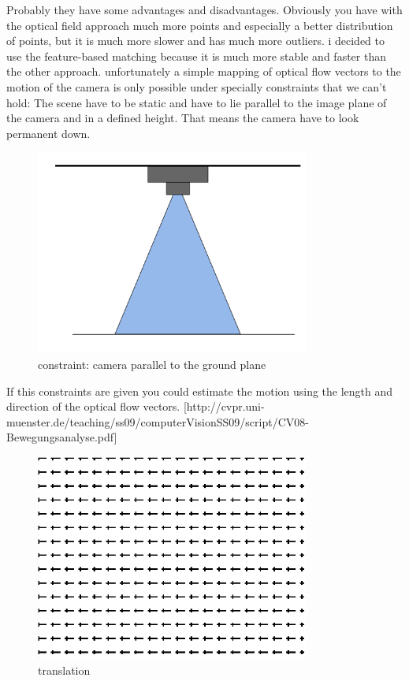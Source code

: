 \documentclass[11pt]{article}
\begin{document}
	Probably they have some advantages and disadvantages. Obviously you have with the optical field approach much more points and especially a better distribution of points, but it is much more slower and has much more outliers. i decided to use the feature-based matching because it is much more stable and faster than the other approach.
	unfortunately a simple mapping of optical flow vectors to the motion of the camera is only possible under specially constraints that we can’t hold: The scene have to be static and have to lie parallel to the image plane of the camera and in a defined height. That means the camera have to look permanent down.
	
	\begin{figure}[ht!]
		\centering
		\includegraphics[width=90mm]{images/look_down.png}
		\caption{constraint: camera parallel to the ground plane \label{overflow}}
	\end{figure}
	
	If this constraints are given you could estimate the motion using the length and direction of the optical flow vectors. [http://cvpr.uni-muenster.de/teaching/ss09/computerVisionSS09/script/CV08-Bewegungsanalyse.pdf]
	
	\begin{figure}[ht!]
		\centering
		\includegraphics[width=90mm]{images/translation.png}
		\caption{translation \label{overflow}}
	\end{figure}
	
\end{document}
